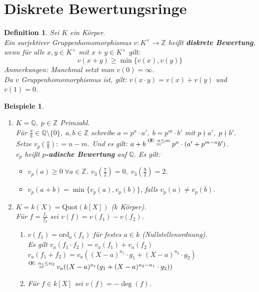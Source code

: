 \documentclass[a4paper,12pt]{scrbook}
\theoremstyle{break}
\newtheorem{Def}{Definition}[chapter]
\theoremstyle{nonumberbreak}
\newtheorem{nnBsp}{Beispiele}
\theoremstyle{nonumberplain}
\newcommand{\emp}[1]{\textbf{\emph{#1}}}
\newcommand{\defeqr}[0]{\mathrel{\mathop:}=}
\renewcommand{\OE}{O\!\!E}
\begin{document}
\section{Diskrete Bewertungsringe}

\begin{Def} 
Sei $K$ ein Körper.\\
Ein surjektiver Gruppenhomomorphismus $v: K^{\times} \to \mathbb{Z}$ heißt
\emp{diskrete Bewertung}, wenn für alle $x,y \in
K^{\times}$ mit $x + y \in K^{\times}$ gilt:
$$ v(x+y) \geq \min\{v(x),v(y)\}$$
Anmerkungen: Manchmal setzt man $v(0) = \infty$.\\
Da $v$ Gruppenhomomorphismus ist, gilt: $v(x \cdot y) = v(x) + v(y)$ und $v(1) = 0$.
\end{Def}

\begin{nnBsp} 
\begin{enumerate}
  \item[1.)] $K = \mathbb{Q}, \; p \in \mathbb{Z}$ Primzahl.\\
  Für $\frac{a}{b} \in \mathbb{Q} \setminus \{0\}, \; a,b \in \mathbb{Z}$
  schreibe $a = p^n \cdot a', \; b = p^m \cdot b'$ mit $p \nmid a',\; p \nmid
  b'$.\\
  Setze $v_p(\frac{a}{b}) \defeqr n - m$.
  Und es gilt: $a + b \overset{\text{\OE: } n \leq m}{=} p^n \cdot (a' + p^{m-n} b')$.\\
  $v_p$ heißt \emp{$p$-adische Bewertung} auf $\mathbb{Q}$. Es gilt:
  \begin{itemize}
    \item $v_p(a) \geq 0 \; \forall a \in \mathbb{Z}$. $v_3(\frac{7}{2}) = 0, \;
    v_3(\frac{9}{2})= 2$.
    \item $v_p(a+b) = \min\{v_p(a),v_p(b)\}$, falls $v_p(a) \not= v_p(b)$.
  \end{itemize}
  \item[2.)] $K = k(X) = \textrm{Quot}(k[X])$ ($k$ Körper).\\
  Für $f = \frac{f_1}{f_2}$ sei $v(f) = v(f_1) - v(f_2)$.
  \begin{enumerate}
    \item $v(f_1) = \textrm{ord}_a(f_1)$ für festes $a \in k$ (Nullstellenordnung).\\
    Es gilt $v_a(f_1 \cdot f_2) = v_a(f_1) + v_a(f_2)$\\
    $v_a(f_1 + f_2) = v_a((X-a)^{n_1} \cdot g_1 + (X-a)^{n_2} \cdot g_2)$\\
    $\overset{\text{\OE: } n_1 \leq n_2}{=} v_a((X-a)^{n_1}(g_1 + (X-a)^{n_2 - 
    n_1} \cdot g_2))$
    \item Für $f \in k[X]$ sei $v(f) = - \deg (f)$.
  \end{enumerate}
\end{enumerate}
\end{nnBsp}
\end{document}
